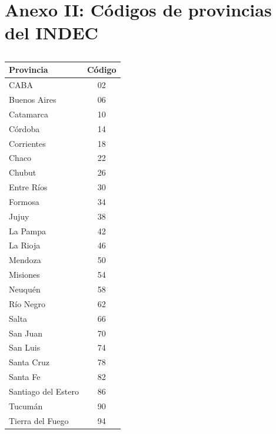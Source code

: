 \documentclass[12pt,a4paper]{article}
\begin{document}
\section{Anexo II: Códigos de provincias del INDEC}
\begin{table}[!htbp]
\caption{}
\centering
\scriptsize
\begin{tabular}{lc}
\hline
Provincia           & Código \\ \hline
CABA                & 02     \\
Buenos Aires        & 06     \\
Catamarca           & 10     \\
Córdoba             & 14     \\
Corrientes          & 18     \\
Chaco               & 22     \\
Chubut              & 26     \\
Entre Ríos          & 30     \\
Formosa             & 34     \\
Jujuy               & 38     \\
La Pampa            & 42     \\
La Rioja            & 46     \\
Mendoza             & 50     \\
Misiones            & 54     \\
Neuquén             & 58     \\
Río Negro           & 62     \\
Salta               & 66     \\
San Juan            & 70     \\
San Luis            & 74     \\
Santa Cruz          & 78     \\
Santa Fe            & 82     \\
Santiago del Estero & 86     \\
Tucumán             & 90     \\
Tierra del Fuego    & 94    
\end{tabular}
\end{table}
\end{document}
